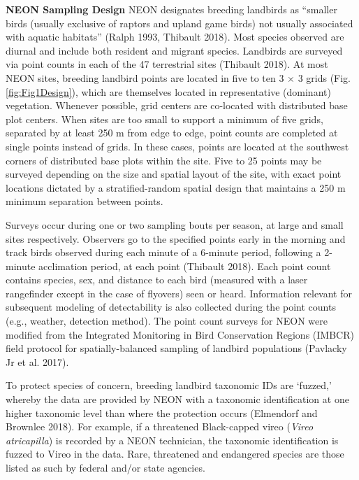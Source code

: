 \documentclass[
  12pt,
]{article}
\begin{document}
\textbf{NEON Sampling Design} NEON designates breeding landbirds as ``smaller birds (usually exclusive of raptors and upland game birds) not usually associated with aquatic habitats'' (Ralph 1993, Thibault 2018). Most species observed are diurnal and include both resident and migrant species. Landbirds are surveyed via point counts in each of the 47 terrestrial sites (Thibault 2018). At most NEON sites, breeding landbird points are located in five to ten 3 \(\times\) 3 grids (Fig. \ref{fig:Fig1Design}), which are themselves located in representative (dominant) vegetation. Whenever possible, grid centers are co-located with distributed base plot centers. When sites are too small to support a minimum of five grids, separated by at least 250 m from edge to edge, point counts are completed at single points instead of grids. In these cases, points are located at the southwest corners of distributed base plots within the site. Five to 25 points may be surveyed depending on the size and spatial layout of the site, with exact point locations dictated by a stratified-random spatial design that maintains a 250 m minimum separation between points.

Surveys occur during one or two sampling bouts per season, at large and small sites respectively. Observers go to the specified points early in the morning and track birds observed during each minute of a 6-minute period, following a 2-minute acclimation period, at each point (Thibault 2018). Each point count contains species, sex, and distance to each bird (measured with a laser rangefinder except in the case of flyovers) seen or heard. Information relevant for subsequent modeling of detectability is also collected during the point counts (e.g., weather, detection method). The point count surveys for NEON were modified from the Integrated Monitoring in Bird Conservation Regions (IMBCR) field protocol for spatially-balanced sampling of landbird populations (Pavlacky Jr et al. 2017).

To protect species of concern, breeding landbird taxonomic IDs are `fuzzed,' whereby the data are provided by NEON with a taxonomic identification at one higher taxonomic level than where the protection occurs (Elmendorf and Brownlee 2018). For example, if a threatened Black-capped vireo (\emph{Vireo atricapilla}) is recorded by a NEON technician, the taxonomic identification is fuzzed to Vireo in the data. Rare, threatened and endangered species are those listed as such by federal and/or state agencies.
\end{document}
